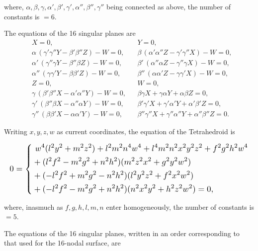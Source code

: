 \documentclass[11pt]{article}
\begin{document}
\medskip

where, $\alpha, \beta, \gamma, \alpha', \beta', \gamma', \alpha'', \beta'', \gamma''$ being connected as above, the number of constants is $=6$.

\medskip

The equations of the 16 singular planes are
\[
\begin{aligned}
& X = 0, & & Y = 0, \\
& \alpha\,(\gamma'\gamma'' Y - \beta'\beta'' Z) - W = 0, & & \beta\,(\alpha'\alpha'' Z - \gamma'\gamma'' X) - W = 0, \\
& \alpha'\,(\gamma''\gamma Y - \beta''\beta Z) - W = 0, & & \beta'\,(\alpha''\alpha Z - \gamma''\gamma X) - W = 0, \\
& \alpha''\,(\gamma\gamma' Y - \beta\beta' Z) - W = 0, & & \beta''\,(\alpha\alpha' Z - \gamma\gamma' X) - W = 0, \\
& Z = 0, & & W = 0, \\
& \gamma\,(\beta'\beta'' X - \alpha'\alpha'' Y) - W = 0, & & \beta\gamma X + \gamma\alpha Y + \alpha\beta Z = 0, \\
& \gamma'\,(\beta''\beta X - \alpha''\alpha Y) - W = 0, & & \beta'\gamma' X + \gamma'\alpha' Y + \alpha'\beta' Z = 0, \\
& \gamma''\,(\beta\beta' X - \alpha\alpha' Y) - W = 0, & & \beta''\gamma'' X + \gamma''\alpha'' Y + \alpha''\beta'' Z = 0.
\end{aligned}
\]

Writing $x, y, z, w$ as current coordinates, the equation of the Tetrahedroid is

\[
\resizebox{\textwidth}{!}{$\displaystyle
0 = \left\{
\begin{aligned}
&\ w^4 (l^2 y^2 + m^2 z^2) + l^2 m^2 n^4 w^4 + l^4 m^2 n^2 x^2 y^2 z^2 + f^2 g^2 h^2 w^4 \\
&+ (l^2 f^2 - m^2 g^2 + n^2 h^2)(m^2 z^2 x^2 + g^2 y^2 w^2) \\
&+ (-l^2 f^2 + m^2 g^2 - n^2 h^2)(l^2 y^2 z^2 + f^2 x^2 w^2) \\
&+ (-l^2 f^2 - m^2 g^2 + n^2 h^2)(n^2 x^2 y^2 + h^2 z^2 w^2) = 0,
\end{aligned}
\right.
$}
\]

where, inasmuch as $f, g, h, l, m, n$ enter homogeneously, the number of constants is $=5$.

\medskip

The equations of the 16 singular planes, written in an order corresponding to that used for the 16-nodal surface, are
\end{document}
